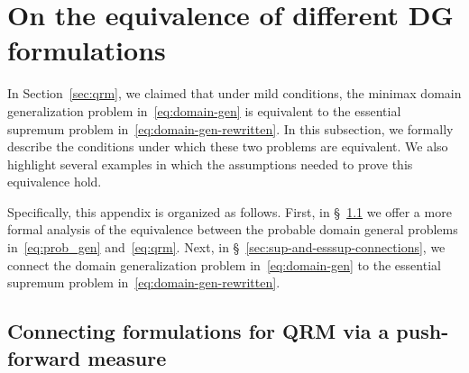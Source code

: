 \documentclass{article}
\begin{document}
%
%

%
%
%

%
%
%
%



%

%


%
%
%
%

\section{On the equivalence of different DG formulations} 
\label{app:sup-and-esssup}

%

In Section~\ref{sec:qrm}, we claimed that under mild conditions, the minimax domain generalization problem in~\eqref{eq:domain-gen} is equivalent to the essential supremum problem in~\eqref{eq:domain-gen-rewritten}.
In this subsection, we formally describe the conditions under which these two problems are equivalent.  We also highlight several examples in which the assumptions needed to prove this equivalence hold.  

Specifically, this appendix is organized as follows.  First, in \S~\ref{sec:formal-connections} we offer a more formal analysis of the equivalence between the probable domain general problems in~\eqref{eq:prob_gen} and~\eqref{eq:qrm}.  Next, in \S~\ref{sec:sup-and-esssup-connections}, we connect the domain generalization problem in~\eqref{eq:domain-gen} to the essential supremum problem in~\eqref{eq:domain-gen-rewritten}.

\subsection{Connecting formulations for QRM via a push-forward measure} \label{sec:formal-connections}
\end{document}
